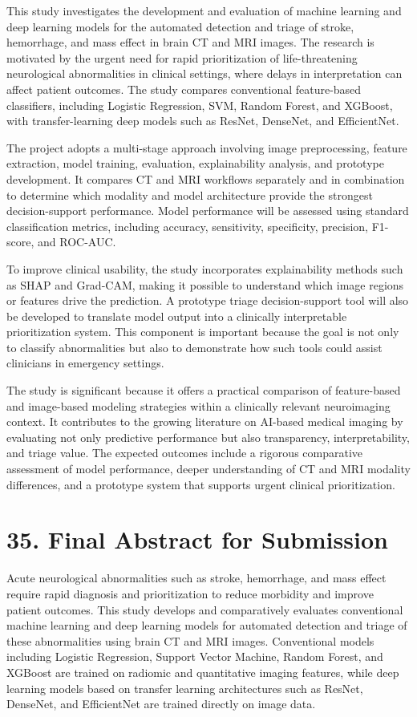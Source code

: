 \documentclass[12pt,a4paper]{report}
\begin{document}
This study investigates the development and evaluation of machine learning and deep learning models for the automated detection and triage of stroke, hemorrhage, and mass effect in brain CT and MRI images. The research is motivated by the urgent need for rapid prioritization of life-threatening neurological abnormalities in clinical settings, where delays in interpretation can affect patient outcomes. The study compares conventional feature-based classifiers, including Logistic Regression, SVM, Random Forest, and XGBoost, with transfer-learning deep models such as ResNet, DenseNet, and EfficientNet.

The project adopts a multi-stage approach involving image preprocessing, feature extraction, model training, evaluation, explainability analysis, and prototype development. It compares CT and MRI workflows separately and in combination to determine which modality and model architecture provide the strongest decision-support performance. Model performance will be assessed using standard classification metrics, including accuracy, sensitivity, specificity, precision, F1-score, and ROC-AUC.

To improve clinical usability, the study incorporates explainability methods such as SHAP and Grad-CAM, making it possible to understand which image regions or features drive the prediction. A prototype triage decision-support tool will also be developed to translate model output into a clinically interpretable prioritization system. This component is important because the goal is not only to classify abnormalities but also to demonstrate how such tools could assist clinicians in emergency settings.

The study is significant because it offers a practical comparison of feature-based and image-based modeling strategies within a clinically relevant neuroimaging context. It contributes to the growing literature on AI-based medical imaging by evaluating not only predictive performance but also transparency, interpretability, and triage value. The expected outcomes include a rigorous comparative assessment of model performance, deeper understanding of CT and MRI modality differences, and a prototype system that supports urgent clinical prioritization.


\section{35. Final Abstract for Submission}

Acute neurological abnormalities such as stroke, hemorrhage, and mass effect require rapid diagnosis and prioritization to reduce morbidity and improve patient outcomes. This study develops and comparatively evaluates conventional machine learning and deep learning models for automated detection and triage of these abnormalities using brain CT and MRI images. Conventional models including Logistic Regression, Support Vector Machine, Random Forest, and XGBoost are trained on radiomic and quantitative imaging features, while deep learning models based on transfer learning architectures such as ResNet, DenseNet, and EfficientNet are trained directly on image data.
\end{document}
